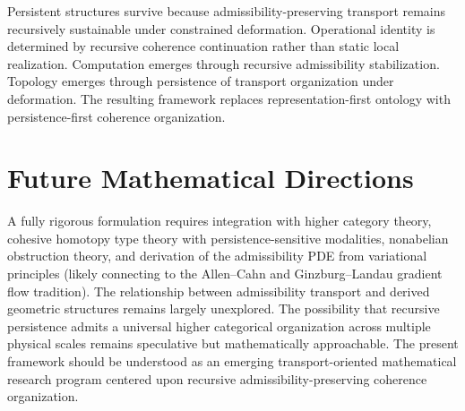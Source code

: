 \documentclass[11pt,openany]{book}
\theoremstyle{definition}
\theoremstyle{plain}
\begin{document}
Persistent structures survive because admissibility-preserving transport remains recursively sustainable under constrained deformation. Operational identity is determined by recursive coherence continuation rather than static local realization. Computation emerges through recursive admissibility stabilization. Topology emerges through persistence of transport organization under deformation. The resulting framework replaces representation-first ontology with persistence-first coherence organization.

\section{Future Mathematical Directions}

A fully rigorous formulation requires integration with higher category theory, cohesive homotopy type theory with persistence-sensitive modalities, nonabelian obstruction theory, and derivation of the admissibility PDE from variational principles (likely connecting to the Allen--Cahn and Ginzburg--Landau gradient flow tradition). The relationship between admissibility transport and derived geometric structures remains largely unexplored. The possibility that recursive persistence admits a universal higher categorical organization across multiple physical scales remains speculative but mathematically approachable. The present framework should be understood as an emerging transport-oriented mathematical research program centered upon recursive admissibility-preserving coherence organization.

\end{document}
